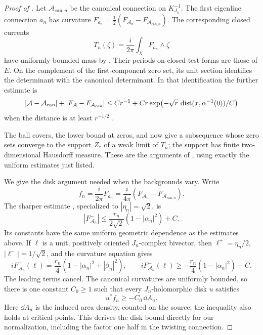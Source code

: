 \begin{proof}[Proof of ]
Let \(\mathcal A_{\mathrm{can},n}\) be the canonical connection
on \(K_{J_n}^{-1}\).  The first eigenline connection \(a_n\)
has curvature
\(F_{a_n}=\tfrac12(F_{\mathcal A_n}
 -F_{\mathcal A_{\mathrm{can},n}})\).
The corresponding closed currents
\begin{equation}
 \label{eq:families-taubes-current}
 T_n(\zeta)=\frac{i}{2\pi}\int_XF_{a_n}\wedge\zeta
\end{equation}
have uniformly bounded mass by
.  Their periods on closed test forms
are those of \(E\).
On the complement of the first-component zero set, its unit section
identifies the determinant with the canonical determinant.  In that
identification the further estimate is
\begin{equation}
 \label{eq:families-taubes-off-zeros}
 |\mathcal A-\mathcal A_{\mathrm{can}}|
   +|F_{\mathcal A}-F_{\mathcal A_{\mathrm{can}}}|
 \le Cr^{-1}+Cr\exp\bigl(-\sqrt r\,
          \operatorname{dist}(x,\alpha^{-1}(0))/C\bigr)
\end{equation}
when the distance is at least \(r^{-1/2}\)
\cite[Proposition~6.1]{Taubes1999}.

The ball covers, the lower bound at zeros, and
 now give a subsequence whose
zero sets converge to the support \(Z_*\) of a weak limit of
\(T_n\); the support has finite two-dimensional Hausdorff measure.
These are the arguments of
\cite[Equations~(7.1)--(7.5) and Lemma~7.1]{Taubes1999}, using
exactly the uniform estimates just listed.

We give the disk argument needed when the backgrounds vary.  Write
\[
 f_n=\frac{i}{2\pi}F_{a_n}
     =\frac{i}{4\pi}(F_{\mathcal A_n}
                          -F_{\mathcal A_{\mathrm{can},n}}).
\]
The sharper estimate
\cite[Proposition~4.2, Equation~(4.9)]{Taubes1999}, specialized to
\(|\eta_n|=\sqrt2\), is
\begin{equation}
 \label{eq:families-taubes-sharp}
 |F_{\mathcal A_n}^-|
 \le \frac{r_n}{2\sqrt2}(1-|\alpha_n|^2)+C.
\end{equation}
Its constants have the same uniform geometric dependence as the
estimates above.  If \(\ell\) is a unit, positively oriented
\(J_n\)-complex bivector, then
\(\ell^+=\eta_n/2\), \(|\ell^-|=1/\sqrt2\), and the
curvature equation gives
\[
 iF_{\mathcal A_n}^+(\ell)
       =\frac{r_n}{4}(1-|\alpha_n|^2+|\beta_n|^2),
 \qquad
 iF_{\mathcal A_n}^-(\ell)
       \ge-\frac{r_n}{4}(1-|\alpha_n|^2)-C.
\]
The leading terms cancel.  The canonical curvatures are uniformly
bounded, so there is one constant \(C_0\ge1\) such that every
\(J_n\)-holomorphic disk \(u\) satisfies
\begin{equation}
 \label{eq:families-disk-lower-bound}
 u^*f_n\ge-C_0\,\dd A_u.
\end{equation}
Here \(\dd A_u\) is the induced area density, counted on the
source; the inequality also holds at critical points.  This derives
the disk bound directly for our normalization, including the factor
one half in the twisting connection.


\end{proof}
